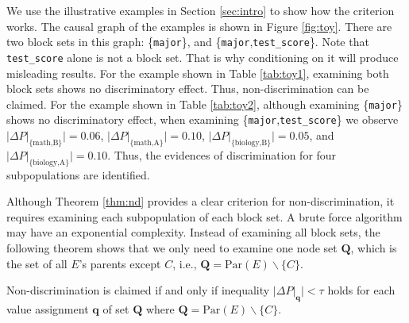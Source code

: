 \documentclass[twoside,leqno,twocolumn]{article}
\begin{document}
We use the illustrative examples in Section \ref{sec:intro} to show how the criterion works. The causal graph of the examples is shown in Figure \ref{fig:toy}. There are two block sets in this graph: \{\texttt{major}\}, and \{\texttt{major},\texttt{test\_score}\}. Note that \texttt{test\_score} alone is not a block set. That is why conditioning on it will produce misleading results. For the example shown in Table \ref{tab:toy1}, examining both block sets shows no discriminatory effect. Thus, non-discrimination can be claimed. For the example shown in Table \ref{tab:toy2}, although examining \{\texttt{major}\} shows no discriminatory effect, when examining \{\texttt{major},\texttt{test\_score}\} we observe $|\Delta P|_{\textrm{\{math,B\}}}| = 0.06$, $|\Delta P|_{\textrm{\{math,A\}}}| = 0.10$, $|\Delta P|_{\textrm{\{biology,B\}}}| = 0.05$, and $|\Delta P|_{\textrm{\{biology,A\}}}| = 0.10$. Thus, the evidences of discrimination for four subpopulations are identified.


Although Theorem \ref{thm:nd} provides a clear criterion for non-discrimination, it requires examining each subpopulation of each block set. A brute force algorithm may have an exponential complexity. Instead of examining all block sets, the following theorem shows that we only need to examine one node set $\mathbf{Q}$, which is the set of all $E$'s parents except $C$, i.e., $\mathbf{Q}=\mathrm{Par}(E)\backslash \{C\}$. %

\begin{theorem}\label{thm:snd}
Non-discrimination is claimed if and only if inequality $|\Delta P|_{\mathbf{q}}| < \tau$ holds for each value assignment $\mathbf{q}$ of set $\mathbf{Q}$ where $\mathbf{Q}=\mathrm{Par}(E)\backslash \{C\}$.
\end{theorem}
\end{document}
